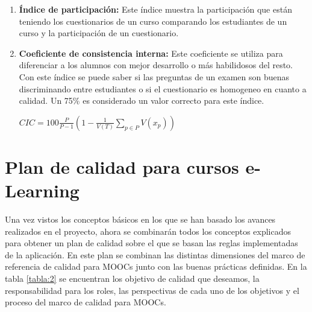 \begin{enumerate}
    \item \textbf{Índice de participación:} Este índice muestra la participación que están teniendo los cuestionarios de un curso comparando los estudiantes de un curso y la participación de un cuestionario.

    \item \textbf{Coeficiente de consistencia interna:} Este coeficiente se utiliza para diferenciar a los alumnos con mejor desarrollo o más  habilidosos del resto. Con este índice se puede saber si las preguntas de un examen son buenas discriminando entre estudiantes o si el cuestionario es homogeneo en cuanto a calidad. Un 75\% es considerado un valor correcto para este índice.
    \begin{center}
        \begin{math}
            CIC = 100\frac{P}{P-1}(1 - \frac{1}{V(T)}\sum_{p\in P} V(x_{p})) 
        \end{math}
    \end{center}    
\end{enumerate}

\section{Plan de calidad para cursos e-Learning}
Una vez vistos los conceptos básicos en los que se han basado los avances realizados en el proyecto, ahora se combinarán todos los conceptos explicados para obtener un plan de calidad sobre el que se basan las reglas implementadas de la aplicación. En este plan se combinan las distintas dimensiones del marco de referencia de calidad para MOOCs\cite{quality-reference-framework} junto con las buenas prácticas definidas. En la tabla \ref{tabla:2} se encuentran los objetivo de calidad que deseamos, la responsabilidad para los roles, las perspectivas de cada uno de los objetivos y el proceso del marco de calidad 
para MOOCs. 

\newpage

